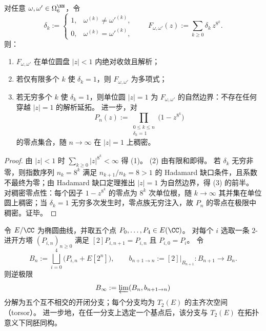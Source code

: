 \begin{theorem}\label{thm:conclusion-window6-gap-series-natural-boundary}
对任意 \(\omega,\omega'\in\Omega_6^{\NN}\)，令
\[
\delta_k:=
\begin{cases}
1,&\omega^{(k)}\neq\omega'^{(k)},\\
0,&\omega^{(k)}=\omega'^{(k)},
\end{cases}
\qquad
F_{\omega,\omega'}(z):=\sum_{k\ge 0}\delta_k\,z^{8^k}.
\]
则：
\begin{enumerate}
  \item \(F_{\omega,\omega'}\) 在单位圆盘 \(|z|<1\) 内绝对收敛且解析；
  \item 若仅有限多个 \(k\) 使 \(\delta_k=1\)，则 \(F_{\omega,\omega'}\) 为多项式；
  \item 若无穷多个 \(k\) 使 \(\delta_k=1\)，则单位圆 \(|z|=1\) 为 \(F_{\omega,\omega'}\) 的自然边界：不存在任何穿越 \(|z|=1\) 的解析延拓。
  进一步，对
  \[
  P_n(z):=\prod_{\substack{0\le k\le n\\ \delta_k=1}}\bigl(1-z^{8^k}\bigr)
  \]
  的零点集合，随 \(n\to\infty\) 在 \(|z|=1\) 上稠密。
\end{enumerate}
\end{theorem}

\begin{proof}
由 \(|z|<1\) 时 \(\sum_{k\ge 0}|z|^{8^k}<\infty\) 得 (1)。
(2) 由有限和即得。
若 \(\delta_k\) 无穷非零，则指数序列 \(n_k=8^k\) 满足 \(n_{k+1}/n_k=8>1\) 的 Hadamard 缺口条件，且系数不最终为零；由 Hadamard 缺口定理推出 \(|z|=1\) 为自然边界，得 (3) 的前半。
对稠密零点性：每个因子 \(1-z^{8^k}\) 的零点为 \(8^k\) 次单位根，随 \(k\to\infty\) 其并集在单位圆上稠密；当 \(\delta_k=1\) 无穷多次发生时，零点族无穷注入，故 \(P_n\) 的零点在极限中稠密。证毕。
\end{proof}

\begin{theorem}\label{thm:conclusion-elliptic-five-leaf-branch-tower-torsor}
令 \(E/\CC\) 为椭圆曲线，并取五个点 \(P_0,\dots,P_4\in E(\CC)\)。
对每个 \(i\) 选取一条 \(2\)-进开方塔 \((P_{i,n})_{n\ge 0}\) 满足 \([2]P_{i,n+1}=P_{i,n}\) 且 \(P_{i,0}=P_i\)。
令
\[
B_n:=\bigsqcup_{i=0}^{4}\bigl(P_{i,n}+E[2^n]\bigr),
\qquad
b_{n+1\to n}:=[2]\big|_{B_{n+1}}:B_{n+1}\to B_n.
\]
则逆极限
\[
B_\infty:=\varprojlim(B_n,b_{n+1\to n})
\]
分解为五个互不相交的开闭分支；每个分支均为 \(T_2(E)\) 的主齐次空间（torsor）。
进一步地，在任一分支上选定一个基点后，该分支与 \(T_2(E)\) 在拓扑意义下同胚同构。
\end{theorem}

